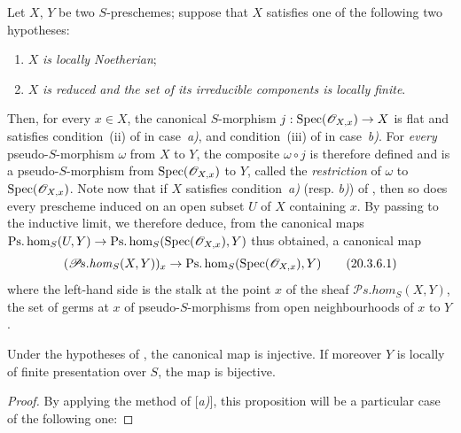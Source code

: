 \begin{env}[20.3.6]\label{IV.20.3.6}
Let $X$, $Y$ be two $S$-preschemes; suppose that $X$ satisfies one of the following two hypotheses:
\begin{enumerate}[label=\alph*)]
  \item $X$ \emph{is locally Noetherian};
  \item $X$ \emph{is reduced and the set of its irreducible components is locally finite}.
\end{enumerate}
Then, for every $x\in X$, the canonical $S$-morphism $j:\operatorname{Spec}(\mathscr{O}_{X,x})\to X$ is flat and satisfies condition~(ii) of  in case~\emph{a)}, and condition~(iii) of  in case~\emph{b)}.
For \emph{every} pseudo-$S$-morphism $\omega$ from $X$ to $Y$, the composite $\omega\circ j$ is therefore defined and is a pseudo-$S$-morphism from $\operatorname{Spec}(\mathscr{O}_{X,x})$ to $Y$, called the \emph{restriction} of $\omega$ to $\operatorname{Spec}(\mathscr{O}_{X,x})$.
Note now that if $X$ satisfies condition~\emph{a)} (resp. \emph{b)}) of , then so does every prescheme induced on an open subset $U$ of $X$ containing $x$.
By passing to the inductive limit, we therefore deduce, from the canonical maps $\operatorname{Ps.hom}_S(U,Y)\to\operatorname{Ps.hom}_S(\operatorname{Spec}(\mathscr{O}_{X,x}),Y)$ thus obtained, a canonical map
\[
\label{IV.20.3.6.1}
  (\mathscr{P}\!s.\mathit{hom}_S(X,Y))_x\to\operatorname{Ps.hom}_S(\operatorname{Spec}(\mathscr{O}_{X,x}),Y)
  \tag{20.3.6.1}
\]
where the left-hand side is the stalk at the point $x$ of the sheaf $\mathscr{P}\!s.\mathit{hom}_S(X,Y)$, the set of germs at $x$ of pseudo-$S$-morphisms from open neighbourhoods of $x$ to $Y$.
\end{env}

\begin{proposition}[20.3.7]
\label{IV.20.3.7}
Under the hypotheses of , the canonical map  is injective.
If moreover $Y$ is locally of finite presentation over $S$, the map  is bijective.
\end{proposition}

\begin{proof}
By applying the method of [\emph{a)}], this proposition will be a particular case of the following one:
\end{proof}


